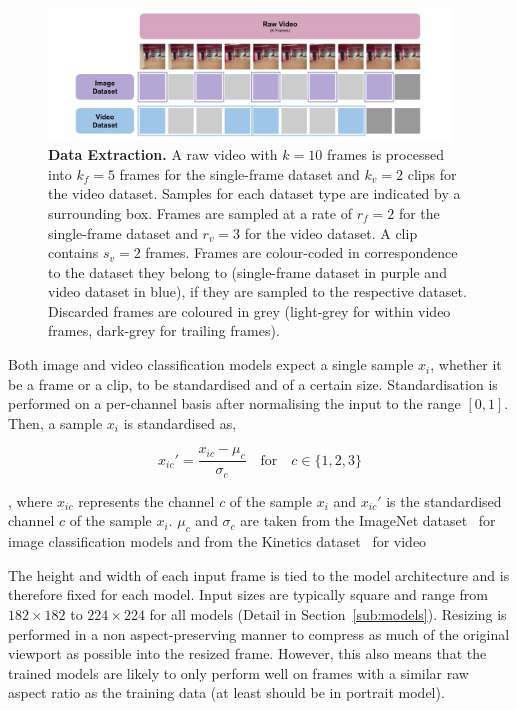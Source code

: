 \documentclass[a4paper]{article}
\begin{document}
  \begin{figure}[ht]
    \centering
    \includegraphics[width=0.95\textwidth]{figures/data-extraction.png}
    \caption{
      \textbf{Data Extraction.} A raw video with $k=10$ frames is processed into
      $k_f=5$ frames for the single-frame dataset and $k_v=2$ clips for the
      video dataset. Samples for each dataset type are indicated by a
      surrounding box. Frames are sampled at a rate of $r_f=2$ for the
      single-frame dataset and $r_v=3$ for the video dataset. A clip contains
      $s_v=2$ frames. Frames are colour-coded in correspondence to the dataset
      they belong to (single-frame dataset in purple and video dataset in blue),
      if they are sampled to the respective dataset. Discarded frames are
      coloured in grey (light-grey for within video frames, dark-grey for
      trailing frames).}
    \label{fig:data-extraction}
  \end{figure}
  
  Both image and video classification models expect a single sample $x_i$,
  whether it be a frame or a clip, to be standardised and of a certain size.
  Standardisation is performed on a per-channel basis after normalising the
  input to the range $[0, 1]$. Then, a sample $x_i$ is standardised as,

  \[
    x_{ic}' = \frac{x_{ic} - \mu_c}{\sigma_c} \quad \text{for} \quad c \in \{1, 2, 3\}
  \]

  , where $x_{ic}$ represents the channel $c$ of the sample $x_i$ and $x_{ic}'$
  is the standardised channel $c$ of the sample $x_i$. $\mu_c$ and $\sigma_c$ are
  taken from the ImageNet dataset~\cite{imagenet} for image classification
  models and from the Kinetics dataset~\cite{kinetics} for video 

  The height and width of each input frame is tied to the model architecture and
  is therefore fixed for each model. Input sizes are typically square and range
  from $182 \times 182$ to $224 \times 224$ for all models (Detail in
  Section~\ref{sub:models}). Resizing is performed in a non aspect-preserving
  manner to compress as much of the original viewport as possible into the
  resized frame. However, this also means that the trained models are likely to
  only perform well on frames with a similar raw aspect ratio as the training
  data (at least should be in portrait model).
\end{document}
